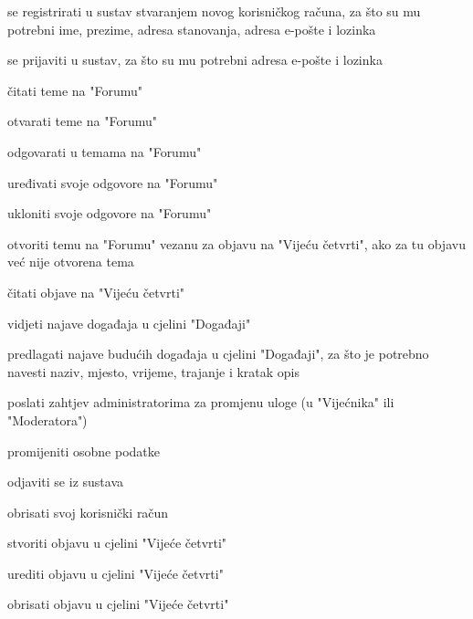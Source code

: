 			
			\begin{packed_enum}
			
				\item  {}
				\begin{packed_enum}
					\item se registrirati u sustav stvaranjem novog korisničkog računa, za što su mu potrebni ime, prezime, adresa stanovanja, adresa e-pošte i lozinka
				\end{packed_enum}
				
				\item  {}
				\begin{packed_enum}
					\item se prijaviti u sustav,	za što su mu potrebni adresa e-pošte i lozinka
				\end{packed_enum}
				
				\item  {}
				\begin{packed_enum}
					\item čitati teme na "Forumu"
					\item otvarati teme na "Forumu"
					\item odgovarati u temama na "Forumu"
					\item uređivati svoje odgovore na "Forumu"
					\item ukloniti svoje odgovore na "Forumu"
					\item otvoriti temu na "Forumu" vezanu za objavu na "Vijeću četvrti", ako za tu objavu već nije otvorena tema
					\item čitati objave na "Vijeću četvrti"
					\item vidjeti najave događaja u cjelini "Događaji"
					\item predlagati najave budućih događaja u cjelini "Događaji", za što je potrebno navesti naziv, mjesto, vrijeme, trajanje i kratak opis
					\item poslati zahtjev administratorima za promjenu uloge (u "Vijećnika" ili "Moderatora")
					\item promijeniti osobne podatke	
					\item odjaviti se iz sustava
					\item obrisati svoj korisnički račun
				\end{packed_enum}
				
				\item  {}
				\begin{packed_enum}
					\item stvoriti objavu u cjelini "Vijeće četvrti"
					\item urediti objavu u cjelini "Vijeće četvrti"
					\item obrisati objavu u cjelini "Vijeće četvrti"	
				\end{packed_enum}
				

\end{packed_enum}
